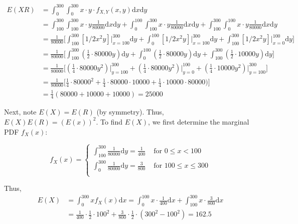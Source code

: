 \documentclass[paper=a4, fontsize=11pt]{scrartcl} %
\numberwithin{equation}{section} %
\numberwithin{figure}{section} %
\numberwithin{table}{section} %
\begin{document}
\begin{align*}
E(XR) &= \int_0^{300}\int_0^{300} x \cdot y \cdot f_{X,Y}(x,y) \textrm{d}x \textrm{d}y\\
   &= \int_{100}^{300}\int_{100}^{300} x \cdot y \frac{1}{80000} \textrm{d}x \textrm{d}y +
         \int_{0}^{100}\int_{100}^{300} x \cdot y \frac{1}{80000} \textrm{d}x \textrm{d}y + 
         \int_{100}^{300}\int_{0}^{100} x \cdot y \frac{1}{80000} \textrm{d}x \textrm{d}y\\
   &= \frac{1}{80000} \Big[\int_{100}^{300} [1/2 x^2 y] \big |_{x=100}^{300} \textrm{d}y +
         \int_{0}^{100}[1/2 x^2 y] \big |_{x=100}^{300} \textrm{d}y + 
         \int_{100}^{300}[1/2 x^2 y] \big |_{x=0}^{100}\textrm{d}y\Big]\\
   &= \frac{1}{80000} \Big[\int_{100}^{300} (\frac{1}{2} \cdot 80000 y) \textrm{d}y +
         \int_{0}^{100}(\frac{1}{2} \cdot 80000 y)\textrm{d}y + 
         \int_{100}^{300}(\frac{1}{2} \cdot 10000 y)\textrm{d}y\Big]\\
   &= \frac{1}{80000} \Big[(\frac{1}{4} \cdot 80000 y^2)\big|_{y=100}^{300} +
        (\frac{1}{4} \cdot 80000 y^2)\big|_{y=0}^{100} + 
        (\frac{1}{4} \cdot 10000 y^2)\big|_{y=100}^{300}\Big]\\
   &= \frac{1}{80000} \Big[\frac{1}{4} \cdot 80000^2 + \frac{1}{4} \cdot 80000 \cdot 10000 + \frac{1}{4} \cdot 10000 \cdot 80000)\Big]\\
   & = \frac{1}{4}(80000+10000+10000)=25000
\end{align*}

Next, note $E(X) = E(R)$ (by symmetry). Thus, $E(X)E(R) = (E(x))^2$. To find $E(X)$, we first determine the marginal PDF $f_X(x)$:

\[
f_{X}(x) = 
\begin{cases}
		\int_{100}^{300} \frac{1}{80000} \textrm{d}y = \frac{1}{400} & \textrm{ for } 0 \leq x < 100 \\
		\int_{0}^{300} \frac{1}{80000} \textrm{d}y = \frac{3}{800} & \textrm{ for } 100 \leq x \leq 300\\
\end{cases}
\]

Thus,
\begin{align*}
E(X) &= \int_0^{300} x f_X(x) \textrm{d}x = \int_0^{100} x \cdot \frac{1}{400} \textrm{d}x + \int_{100}^{300} x \cdot \frac{3}{800} \textrm{d}x\\
   &= \frac{1}{400}\cdot \frac{1}{2} \cdot100^2 + \frac{3}{800} \cdot\frac{1}{2}\cdot (300^2-100^2) = 162.5
\end{align*}
\end{document}
